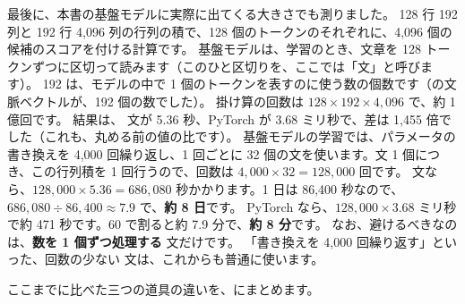 最後に、本書の基盤モデルに実際に出てくる大きさでも測りました。
128 行 192 列と 192 行 4,096 列の行列の積で、128 個のトークンのそれぞれに、4,096 個の候補のスコアを付ける計算です。
基盤モデルは、学習のとき、文章を 128 トークンずつに区切って読みます（このひと区切りを、ここでは「文」と呼びます）。
192 は、モデルの中で 1 個のトークンを表すのに使う数の個数です（の文脈ベクトルが、192 個の数でした）。
掛け算の回数は $128\times 192\times 4{,}096$ で、約 1 億回です。
結果は、 文が 5.36 秒、PyTorch が 3.68 ミリ秒で、差は 1,455 倍でした（これも、丸める前の値の比です）。
基盤モデルの学習では、パラメータの書き換えを 4,000 回繰り返し、1 回ごとに 32 個の文を使います。文 1 個につき、この行列積を 1 回行うので、回数は $4{,}000\times 32=128{,}000$ 回です。
 文なら、$128{,}000\times 5.36=686{,}080$ 秒かかります。1 日は 86,400 秒なので、$686{,}080\div 86{,}400\approx 7.9$ で、\textbf{約 8 日}です。
PyTorch なら、$128{,}000\times 3.68$ ミリ秒で約 471 秒です。60 で割ると約 7.9 分で、\textbf{約 8 分}です。
なお、避けるべきなのは、\textbf{数を 1 個ずつ処理する}  文だけです。
「書き換えを 4,000 回繰り返す」といった、回数の少ない  文は、これからも普通に使います。

ここまでに比べた三つの道具の違いを、にまとめます。

